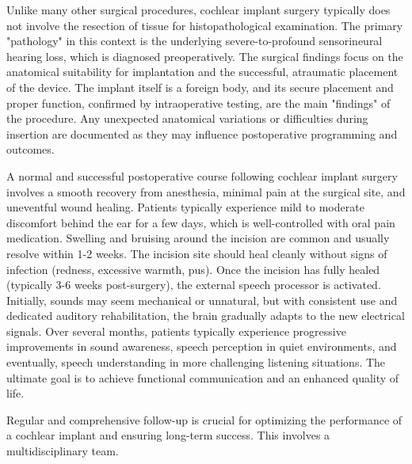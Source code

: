Unlike many other surgical procedures, cochlear implant surgery typically does not involve the resection of tissue for histopathological examination. The primary "pathology" in this context is the underlying severe-to-profound sensorineural hearing loss, which is diagnosed preoperatively. The surgical findings focus on the anatomical suitability for implantation and the successful, atraumatic placement of the device. The implant itself is a foreign body, and its secure placement and proper function, confirmed by intraoperative testing, are the main "findings" of the procedure. Any unexpected anatomical variations or difficulties during insertion are documented as they may influence postoperative programming and outcomes.

A normal and successful postoperative course following cochlear implant surgery involves a smooth recovery from anesthesia, minimal pain at the surgical site, and uneventful wound healing. Patients typically experience mild to moderate discomfort behind the ear for a few days, which is well-controlled with oral pain medication. Swelling and bruising around the incision are common and usually resolve within 1-2 weeks. The incision site should heal cleanly without signs of infection (redness, excessive warmth, pus). Once the incision has fully healed (typically 3-6 weeks post-surgery), the external speech processor is activated. Initially, sounds may seem mechanical or unnatural, but with consistent use and dedicated auditory rehabilitation, the brain gradually adapts to the new electrical signals. Over several months, patients typically experience progressive improvements in sound awareness, speech perception in quiet environments, and eventually, speech understanding in more challenging listening situations. The ultimate goal is to achieve functional communication and an enhanced quality of life.

Regular and comprehensive follow-up is crucial for optimizing the performance of a cochlear implant and ensuring long-term success. This involves a multidisciplinary team.

